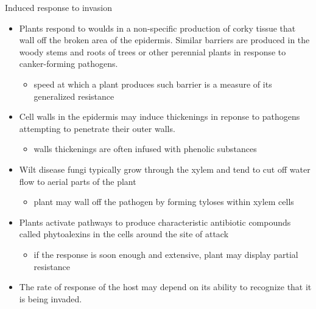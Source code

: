 \documentclass[11pt,dvipsnames,ignorenonframetext,aspectratio=169]{beamer}
\providecommand{\tightlist}{%
  \setlength{\itemsep}{0pt}\setlength{\parskip}{0pt}}
\begin{document}
\begin{frame}{Induced response to invasion}
\protect\hypertarget{induced-response-to-invasion}{}
\footnotesize

\begin{itemize}
\tightlist
\item
  Plants respond to woulds in a non-specific production of corky tissue
  that wall off the broken area of the epidermis. Similar barriers are
  produced in the woody stems and roots of trees or other perennial
  plants in response to canker-forming pathogens.

  \begin{itemize}
  \tightlist
  \item
    speed at which a plant produces such barrier is a measure of its
    generalized resistance
  \end{itemize}
\item
  Cell walls in the epidermis may induce thickenings in reponse to
  pathogens attempting to penetrate their outer walls.

  \begin{itemize}
  \tightlist
  \item
    walls thickenings are often infused with phenolic substances
  \end{itemize}
\item
  Wilt disease fungi typically grow through the xylem and tend to cut
  off water flow to aerial parts of the plant

  \begin{itemize}
  \tightlist
  \item
    plant may wall off the pathogen by forming tyloses within xylem
    cells
  \end{itemize}
\item
  Plants activate pathways to produce characteristic antibiotic
  compounds called phytoalexins in the cells around the site of attack

  \begin{itemize}
  \tightlist
  \item
    if the response is soon enough and extensive, plant may display
    partial resistance
  \end{itemize}
\item
  The rate of response of the host may depend on its ability to
  recognize that it is being invaded.
\end{itemize}
\end{frame}
\end{document}
